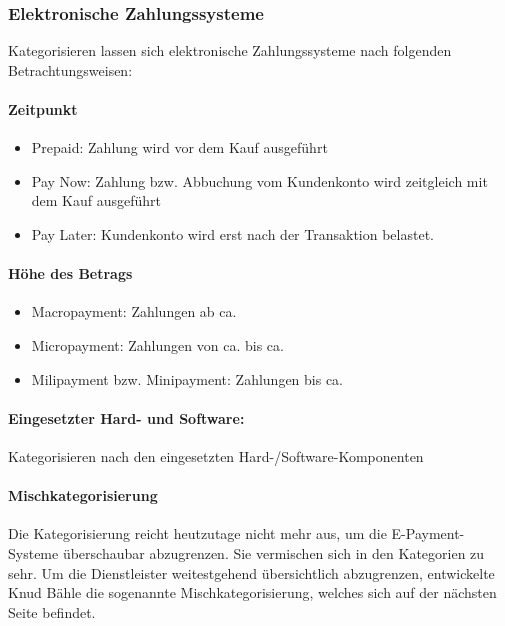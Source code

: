 \newpage

\subsubsection{Elektronische Zahlungssysteme}
Kategorisieren lassen sich elektronische Zahlungssysteme nach folgenden Betrachtungsweisen:
\paragraph{Zeitpunkt}
\begin{itemize}
     \item Prepaid: Zahlung wird vor dem Kauf ausgeführt
     \item Pay Now: Zahlung bzw. Abbuchung vom Kundenkonto wird zeitgleich mit dem Kauf ausgeführt
     \item Pay Later: Kundenkonto wird erst nach der Transaktion belastet.
\end{itemize}

\paragraph{Höhe des Betrags}
\begin{itemize}
     \item Macropayment: Zahlungen ab ca. 
     \item Micropayment: Zahlungen von ca.  bis ca. 
     \item Milipayment bzw. Minipayment: Zahlungen bis ca. 
\end{itemize}

\paragraph{Eingesetzter Hard- und Software:} Kategorisieren nach den eingesetzten Hard-/Software-Komponenten

\paragraph{Mischkategorisierung}
Die Kategorisierung reicht heutzutage nicht mehr aus, um die E-Payment-Systeme überschaubar abzugrenzen. Sie vermischen sich in den Kategorien zu sehr. Um die Dienstleister weitestgehend über\-sichtlich abzugrenzen, entwickelte Knud Bähle die sogenannte Mischkategorisierung, welches sich auf der nächsten Seite befindet.

\newpage

